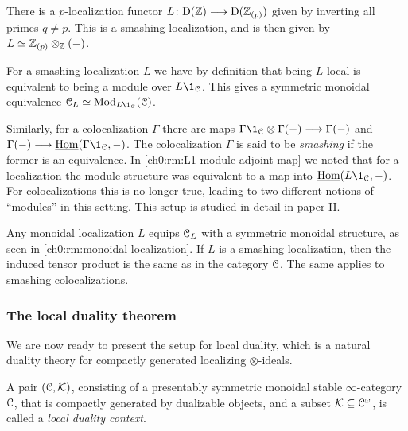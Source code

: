 \begin{example}
    \label{ch0:ex:p-localization-ab-smashing}
    There is a $p$-localization functor $L\colon\mathrm{D}(\mathbb{Z})\longrightarrow \mathrm{D}(\mathbb{Z}_{(p)})$ given by inverting all primes $q\neq p$. This is a smashing localization, and is then given by $L \simeq \mathbb{Z}_{(p)}\otimes_{\mathbb{Z}} (-)$. 
\end{example}

\begin{remark}
    \label{ch0:rm:smashing-then-modules-over-unit}
    For a smashing localization $L$ we have by definition that being $L$-local is equivalent to being a module over $L\1_\C$. This gives a symmetric monoidal equivalence $\C_L \simeq \Mod_{L\1_\C}(\C)$. 
\end{remark}

\begin{remark}
    \label{ch0:rm:smashing-colocalization}
    Similarly, for a colocalization $\Gamma$ there are maps $\Gamma \1_\C \otimes \Gamma(-)\longrightarrow \Gamma (-)$ and $\Gamma(-)\longrightarrow \iHom(\Gamma \1_\C, -)$. The colocalization $\Gamma$ is said to be \emph{smashing} if the former is an equivalence. In \cref{ch0:rm:L1-module-adjoint-map} we noted that for a localization the module structure was equivalent to a map into $\iHom(L\1_\C,-)$. For colocalizations this is no longer true, leading to two different notions of ``modules'' in this setting. This setup is studied in detail in \hyperref[ch2]{paper II}. 
\end{remark}

\begin{remark}
    Any monoidal localization $L$ equips $\EuScript{C}_L$ with a symmetric monoidal structure, as seen in \cref{ch0:rm:monoidal-localization}. If $L$ is a smashing localization, then the induced tensor product is the same as in the category $\EuScript{C}$. The same applies to smashing colocalizations. 
\end{remark}





\subsubsection{The local duality theorem}

We are now ready to present the setup for local duality, which is a natural duality theory for compactly generated localizing $\otimes$-ideals. 

\begin{definition}
    \label{ch0:def:local-duality-context}
    A pair $(\EuScript{C}, \mathcal{K})$, consisting of a presentably symmetric monoidal stable $\infty$-category $\EuScript{C}$, that is compactly generated by dualizable objects, and a subset $\mathcal{K}\subseteq \EuScript{C}^\omega$, is called a \emph{local duality context}.
\end{definition}

